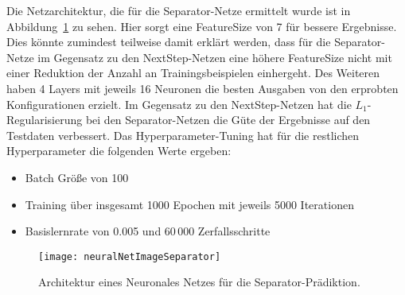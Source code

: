 Die Netzarchitektur, die für die Separator-Netze  ermittelt wurde ist in Abbildung~\ref{fig:netArchitectureSep} zu sehen.
Hier sorgt eine FeatureSize von 7 für bessere Ergebnisse.
Dies könnte zumindest teilweise damit erklärt werden, dass für die Separator-Netze im Gegensatz zu den NextStep-Netzen eine höhere FeatureSize nicht mit einer Reduktion der Anzahl an Trainingsbeispielen einhergeht.
Des Weiteren haben 4 Layers mit jeweils 16 Neuronen die besten Ausgaben von den erprobten Konfigurationen erzielt.
Im Gegensatz zu den NextStep-Netzen hat die \(L_1\)-Regularisierung bei den Separator-Netzen die Güte der Ergebnisse auf den Testdaten verbessert.  
Das Hyperparameter-Tuning hat für die restlichen Hyperparameter die folgenden Werte ergeben:
\begin{itemize}
    \item Batch Größe von 100
    \item Training über insgesamt 1000 Epochen mit jeweils 5000 Iterationen
    \item Basislernrate von 0.005 und 60\,000 Zerfallsschritte
\end{itemize}

% 

\begin{figure}[h]
    \centering
	\texttt{[image: neuralNetImageSeparator]}
	\caption{Architektur eines Neuronales Netzes für die Separator-Prädiktion.}
	\label{fig:netArchitectureSep}
\end{figure}


